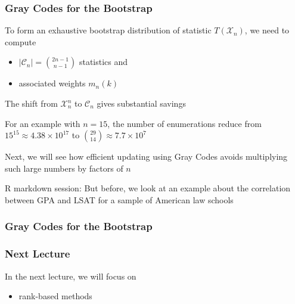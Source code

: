 \documentclass[10pt]{beamer}
\begin{document}
\begin{frame}
\frametitle{Gray Codes for the Bootstrap}

To form an exhaustive bootstrap distribution of statistic $T(\mathcal{X}_n)$, \newline
we need to compute  
\begin{itemize}
\item $|\mathcal{C}_n| = \binom{2n-1 }{n-1}$ statistics and 
\item associated weights $m_n(k)$
\end{itemize}

\vspace{0.3cm}
The shift from $\mathcal{X}_n^n$ to $\mathcal{C}_n$ gives substantial savings \newline

For an example with $n = 15$, the number of enumerations reduce from $15^{15} \approx 4.38 \times 10^{17}$ to $\binom{29}{14} \approx 7.7 \times 10^7$ \newline

Next, we will see how efficient updating using Gray Codes avoids multiplying such large numbers by factors of $n$ \newline

\alert{R markdown session:} But before, we look at an example about the correlation between GPA and LSAT for a sample of American law schools

\end{frame}

\begin{frame}
\frametitle{Gray Codes for the Bootstrap}

\end{frame}

\begin{frame}
\frametitle{Next Lecture}

In the next lecture, we will focus on
\begin{itemize}
\item rank-based methods
\end{itemize}

\end{frame}
\end{document}
